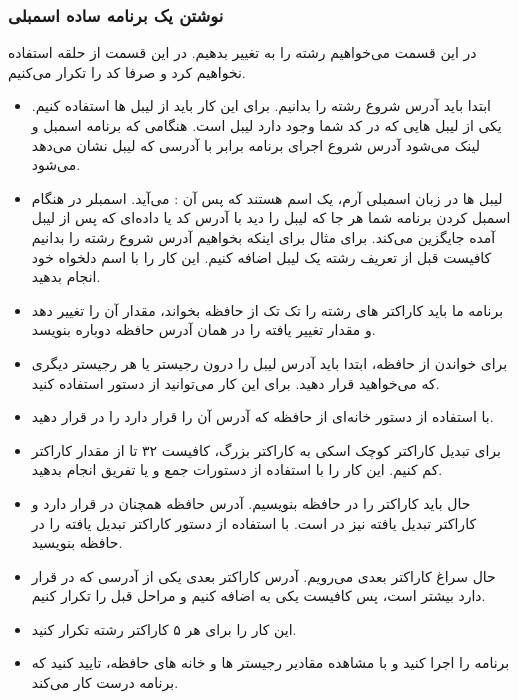 \subsubsection{نوشتن یک برنامه ساده اسمبلی}
در این قسمت می‌خواهیم رشته  را به  تغییر بدهیم. در این قسمت از حلقه استفاده نخواهیم کرد و صرفا کد را تکرار می‌کنیم.
\begin{itemize}
    \item ابتدا باید آدرس شروع رشته را بدانیم. برای این کار باید از لیبل ها استفاده کنیم. یکی از لیبل هایی که در کد شما وجود دارد لیبل  است. هنگامی که برنامه اسمبل و لینک می‌شود آدرس شروع اجرای برنامه برابر با آدرسی که لیبل  نشان می‌دهد می‌شود.
    \item لیبل ها در زبان اسمبلی آرم، یک اسم هستند که پس آن : می‌آید. اسمبلر در هنگام اسمبل کردن برنامه شما هر جا که لیبل را دید با آدرس کد یا داده‌ای که پس از لیبل آمده جایگزین می‌کند. برای مثال برای اینکه بخواهیم آدرس شروع رشته را بدانیم کافیست قبل از تعریف رشته یک لیبل اضافه کنیم. این کار را با اسم دلخواه خود انجام بدهید.
    \item برنامه ما باید کاراکتر های رشته را تک تک از حافظه بخواند، مقدار آن را تغییر دهد و مقدار تغییر یافته را در همان آدرس حافظه دوباره بنویسد.
    \item برای خواندن از حافظه، ابتدا باید آدرس لیبل را درون رجیستر  یا هر رجیستر دیگری که می‌خواهید قرار دهید. برای این کار می‌توانید از دستور  استفاده کنید.
    \item با استفاده از دستور  خانه‌ای از حافظه که آدرس آن را  قرار دارد را در  قرار دهید.
    \item برای تبدیل کاراکتر کوچک اسکی به کاراکتر بزرگ، کافیست ۳۲ تا از مقدار کاراکتر کم کنیم. این کار را با استفاده از دستورات جمع و یا تفریق انجام بدهید.
    \item حال باید کاراکتر را در حافظه بنویسیم. آدرس حافظه همچنان در  قرار دارد و کاراکتر تبدیل یافته نیز در  است. با استفاده از دستور  کاراکتر تبدیل یافته را در حافظه بنویسید.
    \item حال سراغ کاراکتر بعدی می‌رویم. آدرس کاراکتر بعدی یکی از آدرسی که در  قرار دارد بیشتر است، پس کافیست یکی به  اضافه کنیم و مراحل قبل را تکرار کنیم.
    \item این کار را برای هر ۵ کاراکتر رشته تکرار کنید.
    \item برنامه را اجرا کنید و با مشاهده مقادیر رجیستر ها و خانه های حافظه، تایید کنید که برنامه درست کار می‌کند.
\end{itemize}